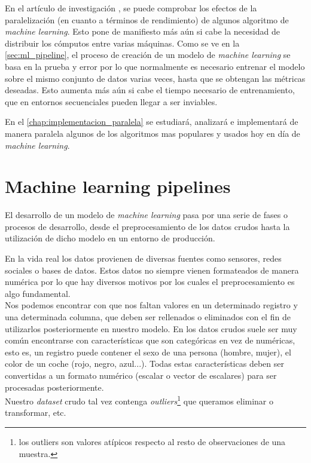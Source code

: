 En el artículo de investigación \cite{NIPS2006_3150}, se puede comprobar los efectos de la paralelización
(en cuanto a términos de rendimiento) de algunos algoritmo de \textit{machine learning}. Esto pone de
manifiesto más aún si cabe la necesidad de distribuir los cómputos entre varias máquinas. Como se ve en
la \autoref{sec:ml_pipeline}, el proceso de creación de un modelo de \textit{machine learning} se basa en
la prueba y error por lo que normalmente es necesario entrenar el modelo sobre el mismo conjunto de datos
varias veces, hasta que se obtengan las métricas deseadas. Esto aumenta más aún si cabe el tiempo necesario
de entrenamiento, que en entornos secuenciales pueden llegar a ser inviables.
\newline

En el \autoref{chap:implementacion_paralela} se estudiará, analizará e implementará de manera paralela 
algunos de los algoritmos mas populares y usados hoy en día de \textit{machine learning}.

\section{Machine learning pipelines}\label{sec:ml_pipeline}
El desarrollo de un modelo de \textit{machine learning} pasa por una serie de fases o procesos de desarrollo,
desde el preprocesamiento de los datos crudos hasta la utilización de dicho modelo en un entorno
de producción.

En la vida real los datos provienen de diversas fuentes como sensores, redes sociales o bases de datos.
Estos datos no siempre vienen formateados de manera numérica por lo que
hay diversos motivos por los cuales el preprocesamiento es algo fundamental.\\
Nos podemos encontrar con que nos faltan valores en un determinado registro y una determinada columna,
que deben ser rellenados o eliminados con el fin de utilizarlos posteriormente en nuestro modelo.
En los datos crudos suele ser muy común encontrarse con características que son categóricas en 
vez de numéricas, esto es, un registro puede contener el sexo de una persona (hombre, mujer), el color 
de un coche (rojo, negro, azul...). 
Todas estas características deben ser convertidas a un formato numérico (escalar o vector de escalares) 
para ser procesadas posteriormente.\\
Nuestro \textit{dataset} crudo tal vez contenga \textit{outliers}\footnote{los outliers son 
valores atípicos  respecto al resto de observaciones de una muestra.} que queramos eliminar o 
transformar, etc.
\newline

